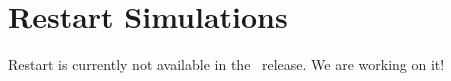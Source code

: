 \section{Restart \Dumux Simulations}
\label{sc_restartsimulations}
Restart is currently not available in the \DumuxVersion~release. We are working on it!


